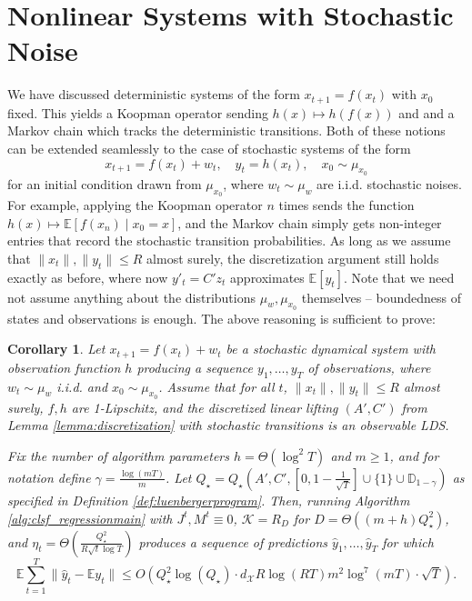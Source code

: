\documentclass[11pt]{article}
\newtheorem{corollary}[theorem]{Corollary}
\numberwithin{equation}{section}
\begin{document}
\section{Nonlinear Systems with Stochastic Noise}
 \label{sec:nl-w-noise}
 We have discussed deterministic systems of the form $x_{t+1} = f(x_t)$ with $x_0$ fixed. This yields a Koopman operator sending $h(x) \mapsto h(f(x))$ and and a Markov chain which tracks the deterministic transitions. Both of these notions can be extended seamlessly to the case of stochastic systems of the form
 $$x_{t+1} = f(x_t) + w_t, \quad y_t = h(x_t), \quad x_0 \sim \mu_{x_0}$$
 for an initial condition drawn from $\mu_{x_0}$, where
 $w_t \sim \mu_w$ are i.i.d. stochastic noises. For example, applying the Koopman operator $n$ times sends the function $h(x) \mapsto \mathbb{E}[f(x_n) \mid x_0 = x]$, and the Markov chain simply gets non-integer entries that record the stochastic transition probabilities. As long as we assume that $\|x_t\|, \|y_t\| \leq R$ almost surely, the discretization argument still holds exactly as before, where now $y'_t = C'z_t$ approximates $\mathbb{E}[y_t]$. Note that we need not assume anything about the distributions $\mu_w, \mu_{x_0}$ themselves -- boundedness of states and observations is enough. The above reasoning is sufficient to prove:
 \begin{corollary}
     Let $x_{t+1} = f(x_t) + w_t$ be a stochastic dynamical system with observation function $h$ producing a sequence $y_1, \ldots, y_T$ of observations, where $w_t \sim \mu_w$ i.i.d. and $x_0 \sim \mu_{x_0}$. Assume that for all $t$, $\|x_t\|, \|y_t\| \leq R$ almost surely, $f, h$ are 1-Lipschitz, and the discretized linear lifting $(A', C')$ from Lemma \ref{lemma:discretization} with stochastic transitions is an observable LDS. 

     Fix the number of algorithm parameters $h = \Theta(\log^2 T)$ and $m \geq 1$, and for notation define $\gamma = \frac{\log(mT)}{m}$. Let $Q_\star = Q_\star\left(A', C', \left[0, 1 - \frac{1}{\sqrt{T}}\right] \cup \{1\} \cup \mathbb{D}_{1-\gamma}\right)$ as specified in Definition \ref{def:luenbergerprogram}. Then, running Algorithm \ref{alg:clsf_regressionmain} with $J^t, M^t \equiv 0$, $\mathcal{K} = R_D$ for $D = \Theta((m+h)Q_\star^2)$, and $\eta_t = \Theta\left(\frac{Q_\star^2}{R\sqrt{t} \log T}\right)$ produces a sequence of predictions $\hat{y}_1, \ldots, \hat{y}_T$ for which
     $$\mathbb{E}\sum_{t=1}^T \|\hat{y}_t - \mathbb{E} y_t\| \leq O\left(Q_\star^2 \log(Q_\star) \cdot d_\mathcal{X} R \log(RT) m^2 \log^7(mT)  \cdot \sqrt{T}\right). $$
 \end{corollary}
\end{document}
